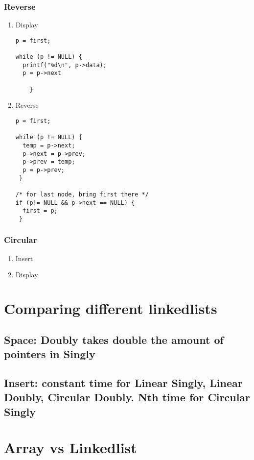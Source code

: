 \documentclass[11pt]{article}
\begin{document}
\subsubsection{Reverse}
\label{sec:orge979e23}
\begin{enumerate}
\item Display
\label{sec:orgecffd58}
\begin{verbatim}
p = first;

while (p != NULL) {
  printf("%d\n", p->data);
  p = p->next

    }

\end{verbatim}
\item Reverse
\label{sec:org2994a66}
\begin{verbatim}
p = first;

while (p != NULL) {
  temp = p->next;
  p->next = p->prev;
  p->prev = temp;
  p = p->prev;
 }

/* for last node, bring first there */
if (p!= NULL && p->next == NULL) {
  first = p;
 }
\end{verbatim}
\end{enumerate}
\subsubsection{Circular}
\label{sec:orga5fdc57}
\begin{enumerate}
\item Insert
\label{sec:org6ddbdab}
\item Display
\label{sec:org1a08351}
\end{enumerate}
\section{Comparing different linkedlists}
\label{sec:orgeadd123}
\subsection{Space: Doubly takes double the amount of pointers in Singly}
\label{sec:org790e75b}
\subsection{Insert: constant time for Linear Singly, Linear Doubly, Circular Doubly.  Nth time for Circular Singly}
\label{sec:orgdc31ba7}
\section{Array vs Linkedlist}
\label{sec:org4243f89}
\end{document}
